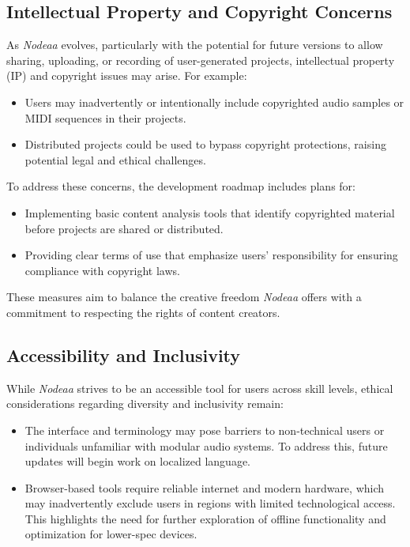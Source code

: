 \documentclass[10pt,twocolumn]{article}
\begin{document}
\subsection{Intellectual Property and Copyright Concerns}
As \textit{Nodeaa} evolves, particularly with the potential for future versions to allow sharing, uploading, or recording of user-generated projects, intellectual property (IP) and copyright issues may arise. For example:
\begin{itemize}
    \item Users may inadvertently or intentionally include copyrighted audio samples or MIDI sequences in their projects.
    \item Distributed projects could be used to bypass copyright protections, raising potential legal and ethical challenges.
\end{itemize}
To address these concerns, the development roadmap includes plans for:
\begin{itemize}
    \item Implementing basic content analysis tools \cite{acoustid} that identify copyrighted material before projects are shared or distributed.
    \item Providing clear terms of use that emphasize users’ responsibility for ensuring compliance with copyright laws.
\end{itemize}
These measures aim to balance the creative freedom \textit{Nodeaa} offers with a commitment to respecting the rights of content creators.

\subsection{Accessibility and Inclusivity}
While \textit{Nodeaa} strives to be an accessible tool for users across skill levels, ethical considerations regarding diversity and inclusivity remain:
\begin{itemize}
    \item The interface and terminology may pose barriers to non-technical users or individuals unfamiliar with modular audio systems. To address this, future updates will begin work on localized language.
    \item Browser-based tools require reliable internet and modern hardware, which may inadvertently exclude users in regions with limited technological access. This highlights the need for further exploration of offline functionality and optimization for lower-spec devices.
\end{itemize}
\end{document}
